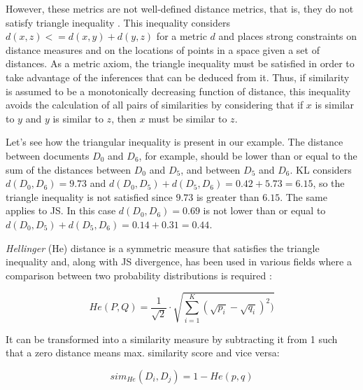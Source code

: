 However, these metrics are not well-defined distance metrics, that is, they do not satisfy triangle inequality \citep{Charikar2002}. This inequality considers $d(x, z) <= d(x, y) + d(y, z)$ for a metric $d$ \citep{Griffiths2007} and places strong constraints on distance measures and on the locations of points in a space given a set of distances. As a metric axiom, the triangle inequality must be satisfied in order to take advantage of the inferences that can be deduced from it. Thus, if similarity is assumed to be a monotonically decreasing function of distance, this inequality avoids the calculation of all pairs of similarities by considering that if $x$ is similar to $y$ and $y$ is similar to $z$, then $x$ must be similar to $z$. 

Let's see how the triangular inequality is present in our example. The distance between documents $D_0$ and $D_6$, for example, should be lower than or equal to the sum of the distances between $D_0$ and $D_5$, and between $D_5$ and $D_6$. KL considers $d(D_0,D_6)=9.73$ and $d(D_0,D_5)+d(D_5,D_6)=0.42+5.73=6.15$, so the triangle inequality is not satisfied since $9.73$ is greater than $6.15$. The same applies to JS. In this case $d(D_0,D_6)=0.69$ is not lower than or equal to $d(D_0,D_5)+d(D_5,D_6)=0.14+0.31=0.44$.


\textit{Hellinger} (He) distance \citep{Basseville89,DasGupta2011} is a symmetric measure that satisfies the triangle inequality and, along with JS divergence, has been used in various fields where a comparison between two probability distributions is required \citep{Blei2007a,Hall2008,Boyd-Graber2010}:

\begin{equation}
	He(P, Q) = \frac{1}{\sqrt{2}}\cdot\sqrt{\sum\limits_{i=1}^K (\sqrt{p_i} - \sqrt{q_i})^2)}
	\label{eq:hedistance}
\end{equation}

It can be transformed into a similarity measure by subtracting it from 1 \citep{Rus2013} such that a zero distance means max. similarity score and vice versa:

\begin{equation}
	sim_{He}(D_i, D_j) = 1 - He(p,q)
	\label{eq:simhe}
\end{equation}


